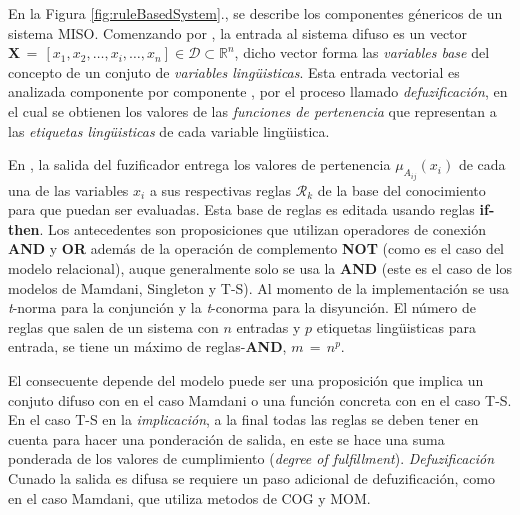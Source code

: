 \documentclass[10pt,onecolumn,twoside,letterpaper]{article}
\begin{document}
En la Figura \ref{fig:ruleBasedSystem}., se describe los componentes g\'enericos de un sistema MISO. Comenzando por , la entrada al sistema difuso es un vector $\mathbf{X}\,=\,\left[x_1,x_2,\ldots,x_i,\ldots,x_n\right]\in\mathcal{D}\subset\mathbb{R}^n$, dicho vector forma las \emph{variables base} del concepto de un conjuto de \emph{variables ling\"uisticas}. Esta entrada vectorial es analizada componente por componente , por el proceso llamado \emph{defuzificaci\'on}, en el cual se obtienen los valores de las \emph{funciones de pertenencia} que representan a las \emph{etiquetas ling\"uisticas} de cada variable ling\"uistica.\\
\par En , la salida del fuzificador entrega los valores de pertenencia $\mu_{A_{ij}}(x_i)$ de cada una de las variables $x_i$ a sus respectivas reglas $\mathcal{R}_k$ de la base del conocimiento para que puedan ser evaluadas. Esta base de reglas es editada usando reglas \textbf{if-then}. Los antecedentes  son proposiciones que utilizan operadores de conexi\'on \textbf{AND} y \textbf{OR} adem\'as de la operaci\'on de complemento \textbf{NOT} (como es el caso del modelo relacional), auque generalmente solo se usa la \textbf{AND} (este es el caso de los modelos de Mamdani, Singleton y T-S).  Al momento de la implementaci\'on se usa \emph{t}-norma para la conjunci\'on y la \emph{t}-conorma para la disyunci\'on. El n\'umero de reglas que salen de un sistema con $n$ entradas y $p$ etiquetas ling\"uisticas para entrada, se tiene un m\'aximo de reglas-\textbf{AND}, $m\,=\,n^p$.\\
\par {} El consecuente depende del modelo puede ser una proposici\'on que implica un conjuto difuso con en el caso Mamdani o una funci\'on concreta con en el caso T-S. En el caso T-S en la \emph{implicaci\'on},  a la final todas las reglas se deben tener en cuenta para hacer una ponderaci\'on de salida, en este se hace una suma ponderada de los valores de cumplimiento (\emph{degree of fulfillment}). \emph{Defuzificaci\'on}  Cunado la salida es difusa se requiere un paso adicional de defuzificaci\'on, como en el caso Mamdani, que utiliza metodos de COG y MOM.
\end{document}
